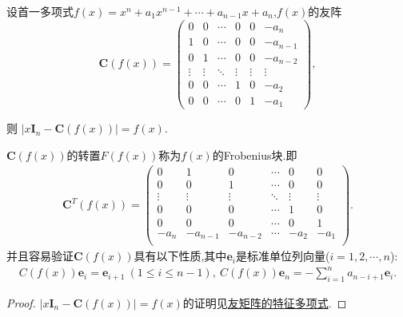 \documentclass[../../main.tex]{subfiles}%
\begin{document}
\begin{proposition}[多项式的友矩阵和Frobenius块]\label{proposition:多项式的友矩和Frobenius块}
设首一多项式\(f(x)=x^{n}+a_{1}x^{n - 1}+\cdots+a_{n - 1}x + a_{n}\),\(f(x)\)的友阵
\[
\boldsymbol{C}(f(x))=\left(\begin{array}{cccccc}
0 & 0 & \cdots & 0 & 0 & -a_{n} \\
1 & 0 & \cdots & 0 & 0 & -a_{n - 1} \\
0 & 1 & \cdots & 0 & 0 & -a_{n - 2} \\
\vdots & \vdots & \ddots & \vdots & \vdots & \vdots \\
0 & 0 & \cdots & 1 & 0 & -a_{2} \\
0 & 0 & \cdots & 0 & 1 & -a_{1}
\end{array}\right),
\]

则
\(\vert x\boldsymbol{I}_{n}-\boldsymbol{C}(f(x))\vert=f(x)\).

\(\boldsymbol{C}(f(x))\)的转置\(F(f(x))\)称为\(f(x)\)的Frobenius块.即
\begin{align*}
\boldsymbol{C}^T(f(x))=\left( \begin{matrix}
0&		1&		0&		\cdots&		0&		0\\
0&		0&		1&		\cdots&		0&		0\\
\vdots&		\vdots&		\vdots&		\ddots&		\vdots&		\vdots\\
0&		0&		0&		\cdots&		1&		0\\
0&		0&		0&		\cdots&		0&		1\\
-a_n&		-a_{n-1}&		-a_{n-2}&		\cdots&		-a_2&		-a_1\\
\end{matrix} \right).
\end{align*}
并且容易验证$\boldsymbol{C}(f(x))$具有以下性质,其中$\boldsymbol{e}_i$是标准单位列向量($i=1,2,\cdots,n$):
\begin{align*}
C(f(x))\boldsymbol{e}_i = \boldsymbol{e}_{i + 1} \ (1 \leqslant  i \leqslant  n - 1), \ C(f(x))\boldsymbol{e}_n = - \sum_{i = 1}^{n} a_{n - i + 1} \boldsymbol{e}_i .
\end{align*}
\end{proposition}
\begin{proof}

\(\vert x\boldsymbol{I}_{n}-\boldsymbol{C}(f(x))\vert=f(x)\)的证明见\hyperref[proposition:多项式的友阵的特征多项式与特征值]{友矩阵的特征多项式}.

\end{proof}
\end{document}
